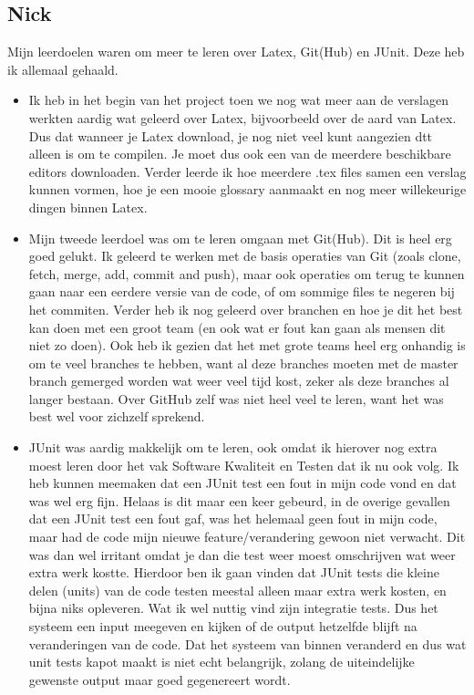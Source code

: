 \subsection*{Nick}
Mijn leerdoelen waren om meer te leren over Latex, Git(Hub) en JUnit. Deze heb ik allemaal gehaald.
\begin{itemize}
    \item Ik heb in het begin van het project toen we nog wat meer aan de verslagen werkten aardig wat geleerd over Latex, bijvoorbeeld over de aard van Latex. Dus dat wanneer je Latex download, je nog niet veel kunt aangezien dtt alleen is om te compilen. Je moet dus ook een van de meerdere beschikbare editors downloaden.
Verder leerde ik hoe meerdere .tex files samen een verslag kunnen vormen, hoe je een mooie glossary aanmaakt en nog meer willekeurige dingen binnen Latex.
    \item Mijn tweede leerdoel was om te leren omgaan met Git(Hub). Dit is heel erg goed gelukt. Ik geleerd te werken met de basis operaties van Git (zoals clone, fetch, merge, add, commit and push), maar ook operaties om terug te kunnen gaan naar een eerdere versie van de code, of om sommige files te negeren bij het commiten.
Verder heb ik nog geleerd over branchen en hoe je dit het best kan doen met een groot team (en ook wat er fout kan gaan als mensen dit niet zo doen).
Ook heb ik gezien dat het met grote teams heel erg onhandig is om te veel branches te hebben, want al deze branches moeten met de master branch gemerged worden wat weer veel tijd kost, zeker als deze branches al langer bestaan.
Over GitHub zelf was niet heel veel te leren, want het was best wel voor zichzelf sprekend.
    \item JUnit was aardig makkelijk om te leren, ook omdat ik hierover nog extra moest leren door het vak Software Kwaliteit en Testen dat ik nu ook volg. Ik heb kunnen meemaken dat een JUnit test een fout in mijn code vond en dat was wel erg fijn. Helaas is dit maar een keer gebeurd, in de overige gevallen dat een JUnit test een fout gaf, was het helemaal geen fout in mijn code, maar had de code mijn nieuwe feature/verandering gewoon niet verwacht. Dit was dan wel irritant omdat je dan die test weer moest omschrijven wat weer extra werk kostte.
Hierdoor ben ik gaan vinden dat JUnit tests die kleine delen (units) van de code testen meestal alleen maar extra werk kosten, en bijna niks opleveren. Wat ik wel nuttig vind zijn integratie tests. Dus het systeem een input meegeven en kijken of de output hetzelfde blijft na veranderingen van de code. Dat het systeem van binnen veranderd en dus wat unit tests kapot maakt is niet echt belangrijk, zolang de uiteindelijke gewenste output maar goed gegenereert wordt.
\end{itemize}